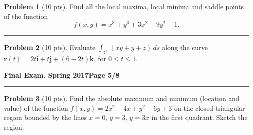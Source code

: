 \documentclass[12pt]{article}
\theoremstyle{definition}
\newtheorem{problem}{Problem}
\begin{document}
\bigskip
\begin{problem}[10 pts]
Find all the local maxima, local minima and saddle points of the function 
\begin{equation*}
f(x,y) = x^3+y^3+3x^2-9y^2-1.
\end{equation*}
  \vspace{13cm}
\end{problem}
\hrule
\begin{problem}[10 pts]
Evaluate $\int_C \, (xy+y+z)\, ds$ along the curve $\boldsymbol{r}(t) = 2t \boldsymbol{i} +t \boldsymbol{j} + (6-2t) \boldsymbol{k}$, for $0 \leq t \leq 1$.
\vspace{5cm}
\begin{flushright}
\end{flushright}
\end{problem}
\newpage

\hfill{\large\bf Final Exam.}\hfill{\large\bf
  Spring 2017}\hfill{\large\bf Page 5/8}\hrule

\bigskip
\begin{problem}[10 pts]
Find the absolute maximum and minimum (location and value) of the function $f(x,y) = 2x^2-4x+y^2-6y+3$ on the closed triangular region bounded by the lines $x=0$, $y=3$, $y=3x$ in the first quadrant.  Sketch the region.

\vspace{0.5cm}
\vspace{14cm}
\begin{flushright}
\end{flushright}
\end{problem}
\newpage
\end{document}
